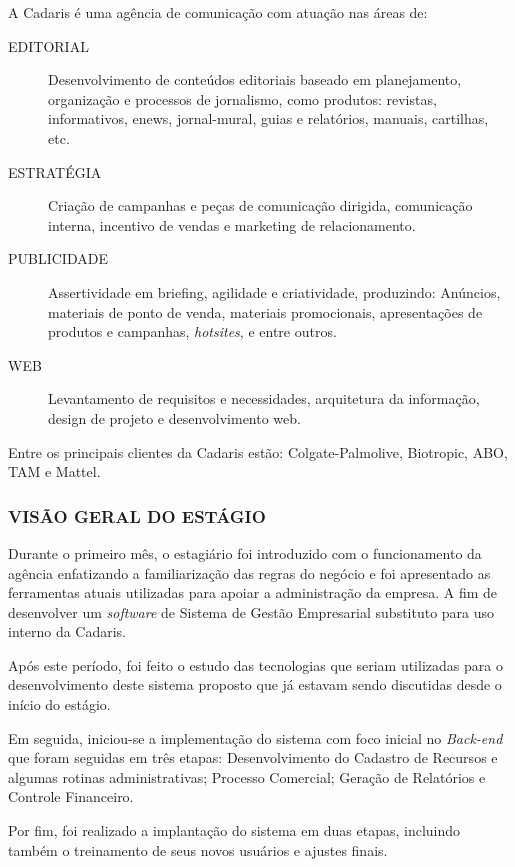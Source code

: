 \documentclass[
  12pt,            %
  openany,
  oneside,
  a4paper,         %
  english,      %
  brazil
]{article}
\numberwithin{figure}{section}
\numberwithin{table}{section}
\begin{document}
A Cadaris é uma agência de comunicação com atuação nas áreas de:
\vspace{-0.5cm}

\begin{description}
  \item [EDITORIAL]   Desenvolvimento de conteúdos editoriais baseado em planejamento, organização e processos de jornalismo, como produtos: revistas, informativos, enews, jornal-mural, guias e relatórios, manuais, cartilhas, etc.
  \item [ESTRATÉGIA]  Criação de campanhas e peças de comunicação dirigida, comunicação interna, incentivo de vendas e marketing de relacionamento.
  \item [PUBLICIDADE] Assertividade em briefing, agilidade e criatividade, produzindo: Anúncios, materiais de ponto de venda, materiais promocionais, apresentações de produtos e campanhas, \textit{hotsites}, e entre outros.
  \item [WEB]         Levantamento de requisitos e necessidades, arquitetura da informação, design de projeto e desenvolvimento web.
\end{description}

Entre os principais clientes da Cadaris estão: Colgate-Palmolive, Biotropic, ABO, TAM e Mattel.


\subsubsection{VISÃO GERAL DO ESTÁGIO}

Durante o primeiro mês, o estagiário foi introduzido com o funcionamento da agência enfatizando a familiarização das regras do negócio e foi apresentado as ferramentas atuais utilizadas para apoiar a administração da empresa. A fim de desenvolver um \textit{software} de Sistema de Gestão Empresarial substituto para uso interno da Cadaris.

Após este período, foi feito o estudo das tecnologias que seriam utilizadas para o desenvolvimento deste sistema proposto que já estavam sendo discutidas desde o início do estágio.

Em seguida, iniciou-se a implementação do sistema com foco inicial no \textit{Back-end} que foram seguidas em três etapas: Desenvolvimento do Cadastro de Recursos e algumas rotinas administrativas; Processo Comercial; Geração de Relatórios e Controle Financeiro.

Por fim, foi realizado a implantação do sistema em duas etapas, incluindo também o treinamento de seus novos usuários e ajustes finais.
\end{document}
